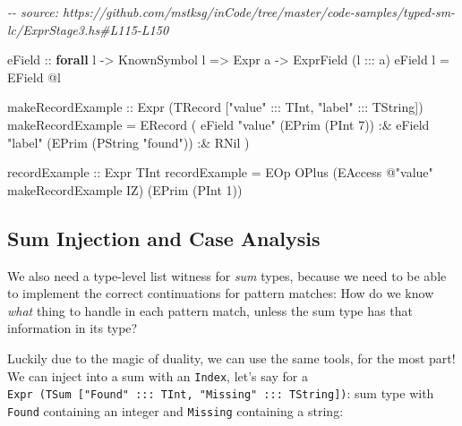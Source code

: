 \documentclass[]{article}
\newenvironment{Shaded}{}{}
\newcommand{\CommentTok}[1]{\textcolor[rgb]{0.38,0.63,0.69}{\textit{#1}}}
\newcommand{\DataTypeTok}[1]{\textcolor[rgb]{0.56,0.13,0.00}{#1}}
\newcommand{\DecValTok}[1]{\textcolor[rgb]{0.25,0.63,0.44}{#1}}
\newcommand{\KeywordTok}[1]{\textcolor[rgb]{0.00,0.44,0.13}{\textbf{#1}}}
\newcommand{\NormalTok}[1]{#1}
\newcommand{\OperatorTok}[1]{\textcolor[rgb]{0.40,0.40,0.40}{#1}}
\newcommand{\OtherTok}[1]{\textcolor[rgb]{0.00,0.44,0.13}{#1}}
\newcommand{\StringTok}[1]{\textcolor[rgb]{0.25,0.44,0.63}{#1}}
\begin{document}
\begin{Shaded}
\begin{Highlighting}[]
\CommentTok{{-}{-} source: https://github.com/mstksg/inCode/tree/master/code{-}samples/typed{-}sm{-}lc/ExprStage3.hs\#L115{-}L150}

\OtherTok{eField ::} \KeywordTok{forall}\NormalTok{ l }\OtherTok{{-}\textgreater{}} \DataTypeTok{KnownSymbol}\NormalTok{ l }\OtherTok{=\textgreater{}} \DataTypeTok{Expr}\NormalTok{ a }\OtherTok{{-}\textgreater{}} \DataTypeTok{ExprField}\NormalTok{ (l }\OperatorTok{:::}\NormalTok{ a)}
\NormalTok{eField l }\OtherTok{=} \DataTypeTok{EField} \OperatorTok{@}\NormalTok{l}

\OtherTok{makeRecordExample ::} \DataTypeTok{Expr}\NormalTok{ (}\DataTypeTok{TRecord}\NormalTok{ [}\StringTok{"value"} \OperatorTok{:::} \DataTypeTok{TInt}\NormalTok{, }\StringTok{"label"} \OperatorTok{:::} \DataTypeTok{TString}\NormalTok{])}
\NormalTok{makeRecordExample }\OtherTok{=}
  \DataTypeTok{ERecord}
\NormalTok{    ( eField }\StringTok{"value"}\NormalTok{ (}\DataTypeTok{EPrim}\NormalTok{ (}\DataTypeTok{PInt} \DecValTok{7}\NormalTok{))}
        \OperatorTok{:\&}\NormalTok{ eField }\StringTok{"label"}\NormalTok{ (}\DataTypeTok{EPrim}\NormalTok{ (}\DataTypeTok{PString} \StringTok{"found"}\NormalTok{))}
        \OperatorTok{:\&} \DataTypeTok{RNil}
\NormalTok{    )}

\OtherTok{recordExample ::} \DataTypeTok{Expr} \DataTypeTok{TInt}
\NormalTok{recordExample }\OtherTok{=} \DataTypeTok{EOp} \DataTypeTok{OPlus}\NormalTok{ (}\DataTypeTok{EAccess} \OperatorTok{@}\StringTok{"value"}\NormalTok{ makeRecordExample }\DataTypeTok{IZ}\NormalTok{) (}\DataTypeTok{EPrim}\NormalTok{ (}\DataTypeTok{PInt} \DecValTok{1}\NormalTok{))}
\end{Highlighting}
\end{Shaded}

\subsection{Sum Injection and Case
Analysis}\label{sum-injection-and-case-analysis}

We also need a type-level list witness for \emph{sum} types, because we need to
be able to implement the correct continuations for pattern matches: How do we
know \emph{what} thing to handle in each pattern match, unless the sum type has
that information in its type?

Luckily due to the magic of duality, we can use the same tools, for the most
part! We can inject into a sum with an \texttt{Index}, let's say for a
\texttt{Expr\ (TSum\ {[}"Found"\ :::\ TInt,\ "Missing"\ :::\ TString{]})}: sum
type with \texttt{Found} containing an integer and \texttt{Missing} containing a
string:
\end{document}
